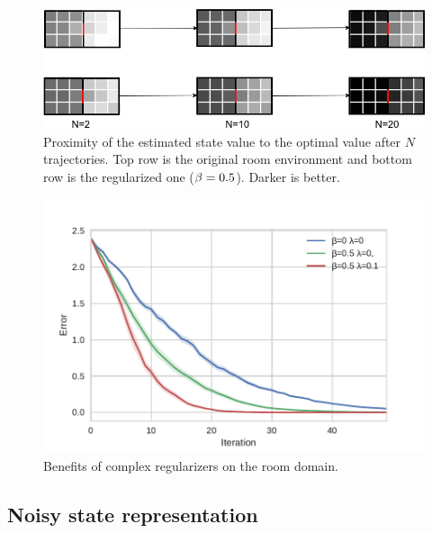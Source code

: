 \begin{figure}
    \centering
    \includegraphics[scale=0.44]{./fig/room.png}
    \caption{Proximity of the estimated state value to the optimal value after $N$ trajectories. Top row is the original room environment and bottom row is the regularized one ($\beta = 0.5$). Darker is better.}
    \label{fig:room}
\end{figure}
\begin{figure}[H]
\centering
\includegraphics[scale=0.60]{./fig/room_perf.pdf}
\caption{Benefits of complex regularizers on the room domain.}
\label{fig:room_perf}
\end{figure}



\subsection{Noisy state representation}
\label{sec:expe:noisy_state}

